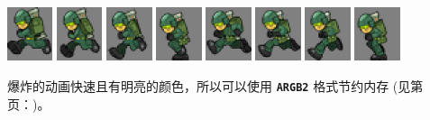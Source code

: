 \documentclass[10pt]{book}
\newcommand{\mach}[1]{\texttt{\textbf{#1}}}
\newcommand{\xref}[1]{第 \pageref{#1} 页：\textit{\nameref{#1}}}
\begin{document}
\begin{CJK}{UTF8}{gkai}
\begin{center}
\includegraphics[width=0.1\textwidth]{previews/nightstrike_0-SOLDIER_RUN-00.png}
\includegraphics[width=0.1\textwidth]{previews/nightstrike_0-SOLDIER_RUN-01.png}
\includegraphics[width=0.1\textwidth]{previews/nightstrike_0-SOLDIER_RUN-02.png}
\includegraphics[width=0.1\textwidth]{previews/nightstrike_0-SOLDIER_RUN-03.png}
\includegraphics[width=0.1\textwidth]{previews/nightstrike_0-SOLDIER_RUN-04.png}
\includegraphics[width=0.1\textwidth]{previews/nightstrike_0-SOLDIER_RUN-05.png}
\includegraphics[width=0.1\textwidth]{previews/nightstrike_0-SOLDIER_RUN-06.png}
\includegraphics[width=0.1\textwidth]{previews/nightstrike_0-SOLDIER_RUN-07.png}
\end{center}

爆炸的动画快速且有明亮的颜色，所以可以使用 \mach{ARGB2} 格式节约内存 (见\xref{eightbit})。


\end{CJK}
\end{document}
